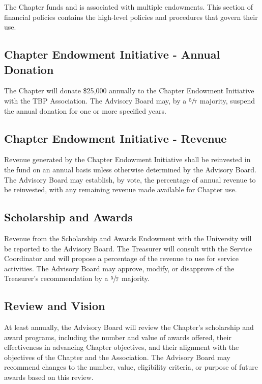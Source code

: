 The Chapter funds and is associated with multiple endowments. This section of financial policies contains the high-level policies and procedures that govern their use.

\subsection{Chapter Endowment Initiative - Annual Donation} \label{X.1}
The Chapter will donate \$25,000 annually to the Chapter Endowment Initiative with the TBP Association. 
The Advisory Board may, by a $\sfrac{5}{7}$ majority, suspend the annual donation for one or more specified years.

\subsection{Chapter Endowment Initiative - Revenue} \label{X.2}
Revenue generated by the Chapter Endowment Initiative shall be reinvested in the fund on an annual basis unless otherwise determined by the Advisory Board. 
The Advisory Board may establish, by vote, the percentage of annual revenue to be reinvested, with any remaining revenue made available for Chapter use.

\subsection{Scholarship and Awards} \label{X.3}
Revenue from the Scholarship and Awards Endowment with the University will be reported to the Advisory Board. 
The Treasurer will consult with the Service Coordinator and will propose a percentage of the revenue to use for service activities. 
The Advisory Board may approve, modify, or disapprove of the Treasurer’s recommendation by a $\sfrac{5}{7}$ majority.

\subsection{Review and Vision} \label{X.4}
At least annually, the Advisory Board will review the Chapter’s scholarship and award programs, including the number and value of awards offered, their effectiveness in advancing 
Chapter objectives, and their alignment with the objectives of the Chapter and the Association. 
The Advisory Board may recommend changes to the number, value, eligibility criteria, or purpose of future awards based on this review.

